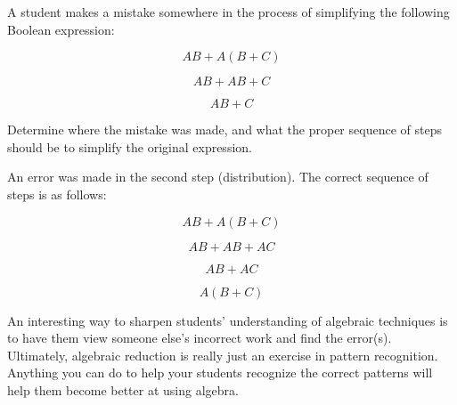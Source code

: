 

A student makes a mistake somewhere in the process of simplifying the following Boolean expression:

$$AB + A(B+C)$$

$$AB + AB + C$$

$$AB + C$$

Determine where the mistake was made, and what the proper sequence of steps should be to simplify the original expression.







An error was made in the second step (distribution).  The correct sequence of steps is as follows: 

$$AB + A(B+C)$$

$$AB + AB + AC$$

$$AB + AC$$

$$A(B + C)$$







An interesting way to sharpen students' understanding of algebraic techniques is to have them view someone else's incorrect work and find the error(s).  Ultimately, algebraic reduction is really just an exercise in pattern recognition.  Anything you can do to help your students recognize the correct patterns will help them become better at using algebra.




